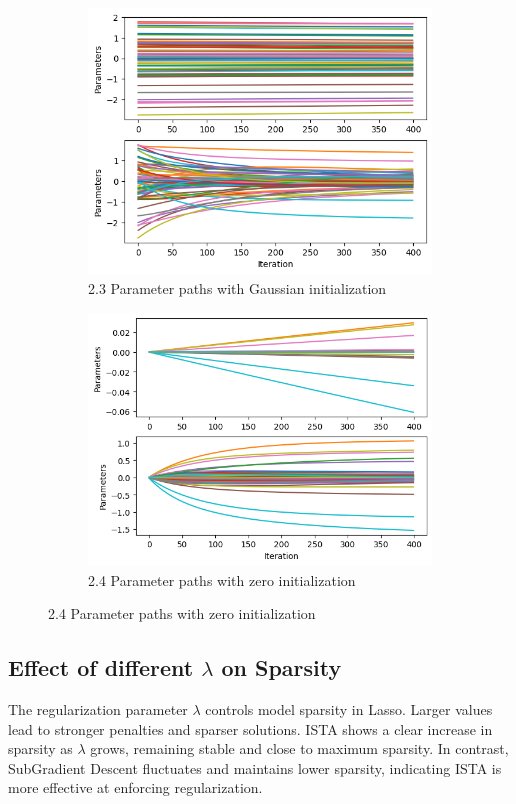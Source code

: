 \documentclass[11pt]{article}
\begin{document}
\begin{figure}[H]
\begin{subfigure}[t]{0.23\textwidth}
        \centering
        \includegraphics[width=\textwidth]{figures/fig3.png}
        \caption{2.3 Parameter paths with Gaussian initialization}
    \end{subfigure}
    \hfill
    \begin{subfigure}[t]{0.23\textwidth}
        \centering
        \includegraphics[width=\textwidth]{figures/fig4.png}
        \caption{2.4 Parameter paths with zero initialization}
    \end{subfigure}

    \label{fig:four-in-a-row}
\end{figure}

\subsection{Effect of different $\lambda$ on Sparsity}
The regularization parameter \( \lambda \) controls model sparsity in Lasso. Larger values lead to stronger penalties and sparser solutions.
ISTA shows a clear increase in sparsity as \( \lambda \) grows, remaining stable and close to maximum sparsity. In contrast, SubGradient Descent fluctuates and maintains lower sparsity, indicating ISTA is more effective at enforcing regularization.
\end{document}
